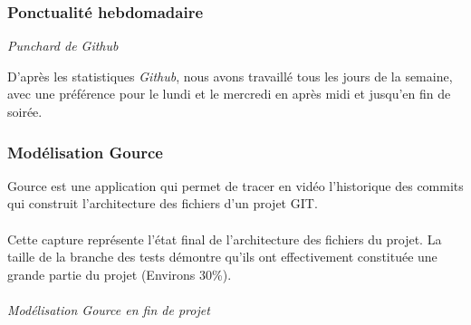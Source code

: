\subsubsection{Ponctualité hebdomadaire}

\noindent
{}
\begin{center}
\textit{Punchard de Github}
\end{center}

D’après les statistiques \emph{Github}, nous avons travaillé tous les jours de la semaine, avec une préférence pour le lundi et le mercredi en après midi et jusqu’en fin de soirée.

\subsubsection{Modélisation Gource}

Gource est une application qui permet de tracer en vidéo l’historique des commits qui construit l’architecture des fichiers d’un projet GIT.

\paragraph{}
Cette capture représente l’état final de l’architecture des fichiers du projet. La taille de la branche des tests démontre qu'ils ont effectivement constituée une grande partie du projet (Environs 30\%).

\paragraph{}
\noindent
{}
\begin{center}
\textit{Modélisation Gource en fin de projet}
\end{center}

